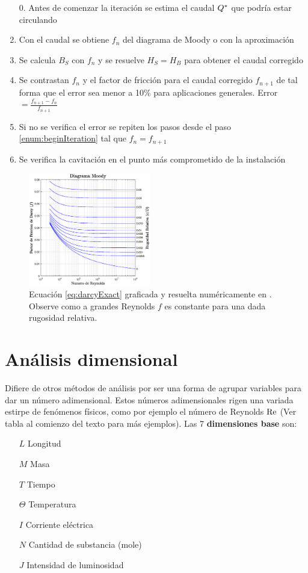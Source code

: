 \begin{enumerate}
	\item[0.] Antes de comenzar la iteración se estima el caudal ${Q^{*}}$ que podría estar circulando
	\setcounter{enumi}{0}
	\item Con el caudal se obtiene $f_{n}$ del diagrama de Moody o con la aproximación \label{enum:beginIteration}
	\item Se calcula $B_S$ con $f_{n}$ y se resuelve $H_S=H_B$ para obtener el caudal corregido 
	\item Se contrastan $f_{n}$ y el factor de fricción para el caudal corregido $f_{n+1}$ de tal forma que el error sea menor a 10\% para aplicaciones generales. Error $=\frac{f_{n+1}-f_{n}}{f_{n+1}}$
	\item Si no se verifica el error se repiten los pasos desde el paso \ref{enum:beginIteration} tal que $f_n=f_{n+1}$
	\item Se verifica la cavitación en el punto más comprometido de la instalación
\end{enumerate}

\begin{figure}[htb!]
    \centering
    \includegraphics[width=0.475\textwidth]{fig/moodydiag.eps}
    \caption{Ecuación \ref{eq:darcyExact} graficada y resuelta numéricamente en \Matlab. Observe como a grandes Reynolds $f$ es constante para una dada rugosidad relativa.}
    \label{fig:moodydiagram}
\end{figure}


\section{Análisis dimensional}
Difiere de otros métodos de análisis por ser una forma de agrupar variables para dar un número adimensional. Estos números adimensionales rigen una variada estirpe de fenómenos físicos, como por ejemplo el número de Reynolds $\textrm{Re}$ (Ver tabla al comienzo del texto para más ejemplos). Las 7 \textbf{dimensiones base} son:
\begin{itemize}
    \item[$L$] Longitud
    \item[$M$] Masa
    \item[$T$] Tiempo
    \item[$\Theta$] Temperatura
    \item[$I$] Corriente eléctrica
    \item[$N$] Cantidad de substancia (mole)
    \item[$J$] Intensidad de luminosidad
\end{itemize}

